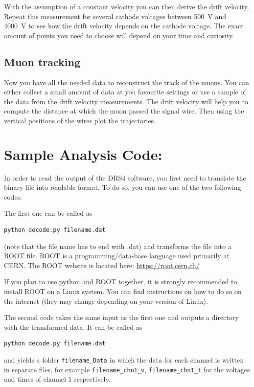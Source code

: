 \documentclass[12pt]{article}
\begin{document}
 With the assumption of a constant velocity you can then derive the drift velocity. Repeat this measurement for several cathode voltages between \SI{500}{\volt} and \SI{4000}{\volt} to see how the drift velocity depends on the cathode voltage. The exact amount of points you need to choose will depend on your time and curiosity.

\subsection{Muon tracking}

Now you have all the needed data to reconstruct the track of the muons. You can either collect a small amount of data at you favourite settings or use a sample of the data from the drift velocity measurements. The drift velocity will help you to compute the distance at which the muon passed the signal wire. Then using the vertical positions of the wires plot the trajectories.




\pagebreak

\appendix
\section{Sample Analysis Code:}\label{sec:decode}
In order to read the output of the DRS4 software, you first need to translate the binary file into readable format. To do so, you can use one of the two following codes:

The first one can be called as
\begin{lstlisting}[language=bash]
  python decode.py filename.dat
\end{lstlisting}
(note that the file name has to end with .dat) and transforms the file into a ROOT file. ROOT is a programming/data-base language used primarily at CERN. The ROOT website is located here:
\url{https://root.cern.ch/}

If you plan to use python and ROOT together, it is strongly recommended to install ROOT on a Linux system. You can find instructions on how to do so on the internet (they may change depending on your version of Linux).

The second code takes the same input as the first one and outputs a directory with the transformed data. It can be called as
\begin{lstlisting}[language=bash]
  python decode.py filename.dat
\end{lstlisting}
and yields a folder \verb|filename_Data| in which the data for each channel is written in separate files, for example \verb|filename_chn1_v|, \verb|filename_chn1_t| for the voltages and times of channel 1 respectively.
\end{document}
